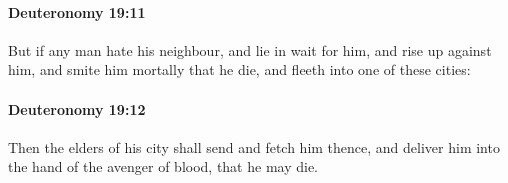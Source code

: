 		\paragraph{Deuteronomy 19:11} %
			\label{DEUTERONOMY-19-11}

			But if any man hate his neighbour, and lie in wait for him, and rise up against him, and smite him mortally that he die, and fleeth into one of these cities:


		\paragraph{Deuteronomy 19:12} %
			\label{DEUTERONOMY-19-12}

			Then the elders of his city shall send and fetch him thence, and deliver him into the hand of the avenger of blood, that he may die.


